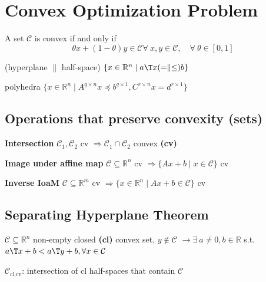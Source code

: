 \section{Convex Optimization Problem}

\begin{definition}
	A set $\mathcal{C}$ is convex if and only if
	\vspace{-1mm}
	$$\theta x + (1-\theta)y \in \mathcal{C}
		\forall\ x,y \in \mathcal{C},\quad
		\forall\ \theta \in [0,1]$$
	\vspace{-3mm}
\end{definition}
\vspace{-1mm}

(hyperplane $\parallel$ half-space)
$\{x \in \mathbb{R}^n \mid a\T x(=\parallel\le)b\}$

polyhedra $\{x\in\mathbb{R}^n\mid A^{q\times n}x\preceq b^{q\times1},C^{r\times n}x=d^{r\times1}\}$


\subsection{Operations that preserve convexity (sets)}

\textbf{Intersection}
$\mathcal{C}_1, \mathcal{C}_2$ cv
$\Rightarrow \mathcal{C}_1 \cap \mathcal{C}_2$ convex \textbf{(cv)}

\textbf{Image under affine map}
$\mathcal{C} \subseteq  \mathbb{R}^{n}$ cv
$\Rightarrow \{Ax+b \mid x \in \mathcal{C} \}$ cv

\textbf{Inverse IoaM}
$\mathcal{C} \subseteq  \mathbb{R}^{m}$ cv
$\Rightarrow \{x\in\mathbb{R}^{n} \mid  Ax+b\in\mathcal{C}\}$ cv

\subsection{Separating Hyperplane Theorem}

\begin{theorem}
	$\mathcal{C} \subseteq \mathbb{R}^{n}$ non-empty closed \textbf{(cl)} convex set, $y \notin \mathcal{C}$
	$\rightarrow \exists\ a \ne 0, b \in \mathbb{R}$
	s.t. $a\T x + b < a\T y + b,
		\forall x \in \mathcal{C}$
\end{theorem}

\begin{corollary}
	$\mathcal{C}_\text{cl,cv}$: intersection of cl half-spaces that contain $\mathcal{C}$
\end{corollary}

